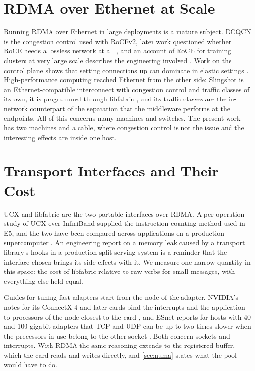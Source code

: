 \section{RDMA over Ethernet at Scale}

Running RDMA over Ethernet in large deployments is a mature subject. DCQCN
\citep{zhu2015dcqcn} is the congestion control used with RoCEv2, later work
questioned whether RoCE needs a lossless network at all
\citep{mittal2018irn}, and an account of RoCE for training clusters at very
large scale describes the engineering involved \citep{gangidi2024meta}. Work on the control plane shows that setting connections up can dominate in
elastic settings \citep{zhang2025swift}. High-performance computing reached
Ethernet from the other side: Slingshot \citep{desensi2020slingshot} is an
Ethernet-compatible interconnect with congestion control and traffic classes
of its own, it is programmed through libfabric \citep{libfabric_repo}, and
its traffic classes are the in-network counterpart of the separation that
the middleware performs at the endpoints. All of this concerns many machines
and switches. The present work has two machines and a cable, where congestion
control is not the issue and the interesting effects are inside one host.

\section{Transport Interfaces and Their Cost}

UCX \citep{shamis2015ucx} and libfabric \citep{grun2015ofi} are the two
portable interfaces over RDMA. A per-operation study of UCX over InfiniBand
\citep{papadopoulou2017ucx} supplied the instruction-counting method used in
E5, and the two have been compared across applications on a production
supercomputer \citep{bareford2022}.
An engineering report on a memory leak caused by a transport library's hooks
in a production split-serving system \citep{mistral2026leak} is a reminder
that the interface chosen brings its side effects with it. We measure one narrow quantity in this space: the cost of libfabric relative to raw verbs for small messages, with everything else held equal.

Guides for tuning fast adapters start from the node of the adapter. NVIDIA's
notes for its ConnectX-4 and later cards bind the interrupts and the
application to processors of the node closest to the card
\citep{nvidia_cx4_tuning}, and ESnet reports for hosts with 40 and 100
gigabit adapters that TCP and UDP can be up to two times slower when the
processors in use belong to the other socket \citep{esnet_irq}. Both concern
sockets and interrupts. With RDMA the same reasoning extends to the
registered buffer, which the card reads and writes directly, and
\cref{sec:numa} states what the pool would have to do.

